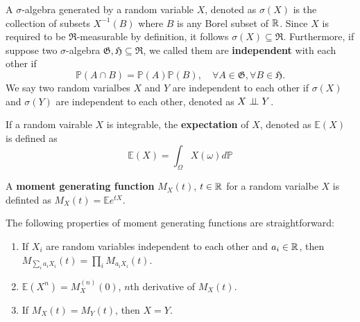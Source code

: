 \begin{definition}
A $\sigma$-algebra generated by a random variable $X$, denoted as $\sigma(X)$ is the collection of subsets $X^{-1}(B)$ where $B$ is any Borel subset of $\mathbb{R}$. Since $X$ is required to be $\mathfrak{R}$-measurable by definition, it follows $\sigma(X)\subseteq\mathfrak{R}$. Furthermore, if suppose two $\sigma$-algebra $\mathfrak{G,H}\subseteq\mathfrak{R}$, we called them are \textbf{independent} with each other if
	\begin{equation}
	\mathbb{P}(A\cap B)=\mathbb{P}(A)\mathbb{P}(B),\quad \forall A\in\mathfrak{G}, \forall B\in\mathfrak{H}.
	\end{equation}
We say two random varialbes $X$ and $Y$ are independent to each other if $\sigma(X)$ and $\sigma(Y)$ are independent to each other, denoted as $X\perp\!\!\!\perp Y$.
\end{definition}

\begin{definition}
If a random vairable $X$ is integrable, the \textbf{expectation} of $X$, denoted as $\mathbb{E}(X)$ is defined as
	\begin{equation}
	\mathbb{E}(X)=\int_{\Omega}X(\omega) d\mathbb{P}
	\end{equation}
\end{definition}

\begin{definition}
A \textbf{moment generating function} $M_X(t)$, $t\in\mathbb{R}$ for a random varialbe $X$ is definted as $M_X(t)=\mathbb{E}e^{tX}$.
\end{definition}

\begin{theorem}
The following properties of moment generating functions are straightforward:
	\begin{enumerate}
	\item If $X_i$ are random variables independent to each other and $a_i\in\mathbb{R}$, then $M_{\sum_ia_iX_i}(t)=\prod_i M_{a_iX_i}(t)$.
	\item $\mathbb{E}(X^n)=M_X^{(n)}(0)$, $n$th derivative of $M_X(t)$.
	\item If $M_X(t)=M_Y(t)$, then $X=Y$.
	\end{enumerate}
\end{theorem}
